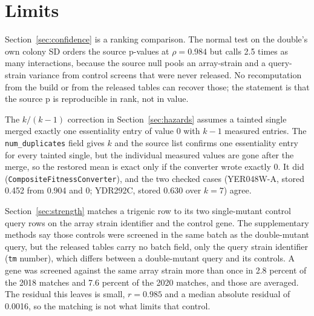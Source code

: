 
\section{Limits}

Section~\ref{sec:confidence} is a ranking comparison. The normal test on the double's
own colony SD orders the source p-values at $\rho = 0.984$ but calls 2.5 times as many
interactions, because the source null pools an array-strain and a query-strain
variance from control screens that were never released. No recomputation from the
build or from the released tables can recover those; the statement is that the
source p is reproducible in rank, not in value.

The $k/(k-1)$ correction in Section~\ref{sec:hazards} assumes a tainted single merged
exactly one essentiality entry of value 0 with $k-1$ measured entries. The
\texttt{num\_duplicates} field gives $k$ and the source list confirms one essentiality
entry for every tainted single, but the individual measured values are gone after the
merge, so the restored mean is exact only if the converter wrote exactly 0. It did
(\texttt{CompositeFitnessConverter}), and the two checked cases (YER048W-A, stored
0.452 from 0.904 and 0; YDR292C, stored 0.630 over $k = 7$) agree.

Section~\ref{sec:strength} matches a trigenic row to its two single-mutant control
query rows on the array strain identifier and the control gene. The supplementary
methods say those controls were screened in the same batch as the double-mutant query,
but the released tables carry no batch field, only the query strain identifier
(\texttt{tm} number), which differs between a double-mutant query and its controls. A
gene was screened against the same array strain more than once in 2.8 percent of the
2018 matches and 7.6 percent of the 2020 matches, and those are averaged. The residual
this leaves is small, $r = 0.985$ and a median absolute residual of 0.0016, so the
matching is not what limits that control.

